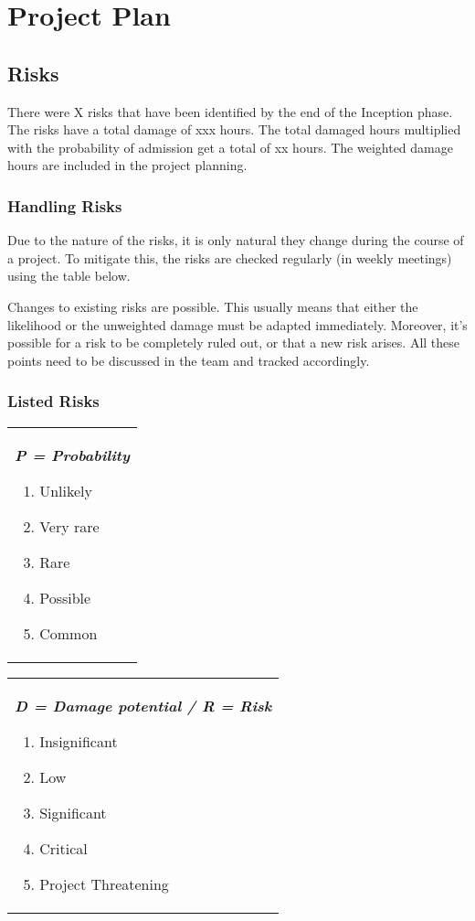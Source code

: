 \chapter{Project Plan}
\section{Risks}
There were X risks that have been identified by the end of the Inception phase.
The risks have a total damage of xxx hours. The total damaged hours multiplied
with the probability of admission get a total of xx hours. The weighted damage
hours are included in the project planning.

\subsection{Handling Risks}
Due to the nature of the risks, it is only natural they change during the course of a project.
To mitigate this, the risks are checked regularly (in weekly meetings) using the table below.

Changes to existing risks are possible. This usually means that either the likelihood or
the unweighted damage must be adapted immediately. Moreover, it's possible for a risk to
be completely ruled out, or that a new risk arises. All these points need to be discussed in
the team and tracked accordingly.

\subsection{Listed Risks}
\begin{tabular}[t]{@{}>{\raggedright}p{}}
  \textbf{\textit{P = Probability}}
  \begin{enumerate}[topsep=0pt,itemsep=-2pt,leftmargin=13pt]
  \item Unlikely
  \item Very rare
  \item Rare
  \item Possible
  \item Common
  \end{enumerate}
\end{tabular}
\begin{tabular}[t]{@{}>{\raggedright}p{}@{}}
  \textbf{\textit{D = Damage potential  / R = Risk}}
  \begin{enumerate}[topsep=0pt,itemsep=-2pt,leftmargin=13pt]
  \item Insignificant
  \item Low
  \item Significant
  \item Critical
  \item Project Threatening
  \end{enumerate}
\end{tabular}

